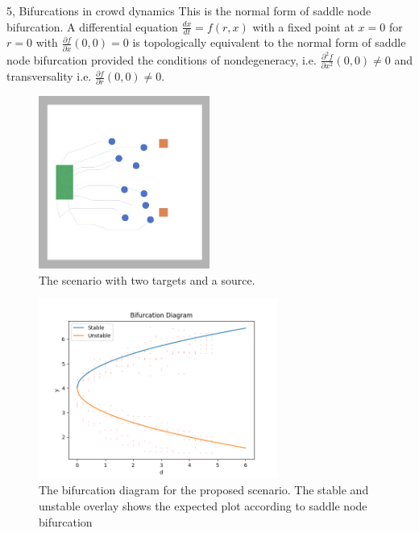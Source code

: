 \documentclass[10pt,a4paper]{article}
\begin{document}
\begin{task}{5, Bifurcations in crowd dynamics}
This is the normal form of saddle node bifurcation. A differential equation $\frac{dx}{dt} = f(r, x)$ with a fixed point at $x=0$ for $r=0$ with $\frac{\partial f}{\partial x}(0, 0) = 0$ is topologically equivalent to the normal form of saddle node bifurcation provided the conditions of nondegeneracy, i.e. $\frac{\partial^2 f}{\partial x^2}(0, 0) \neq 0$ and transversality i.e. $\frac{\partial f}{\partial r}(0, 0) \neq 0$. 

\begin{figure}[H]
    \centering
    \includegraphics[width=0.5\textwidth]{./pictures/task5_2.jpeg}
    \caption{The scenario with two targets and a source.}
    \label{fig:task5_2}
\end{figure}

\begin{figure}[H]
    \centering
    \includegraphics[width=0.7\textwidth]{../plots/task5/saddle_bifurcation.png}
    \caption{The bifurcation diagram for the proposed scenario. The stable and unstable overlay shows the expected plot according to saddle node bifurcation}
    \label{fig:part2_bifurcation}
\end{figure}


\end{task}
\end{document}
